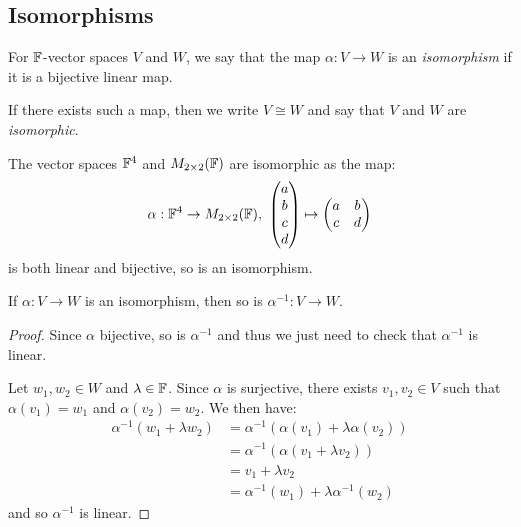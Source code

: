 \documentclass[../main.tex]{subfiles}
\begin{document}
\subsection{Isomorphisms}
\begin{definition}
  For $\mathbb{F}$-vector spaces $V$ and $W$, we say that the map $\alpha: V \to W$ is an \textit{isomorphism} if it is a bijective linear map. \label{isoDef}

  If there exists such a map, then we write $V \cong W$ and say that $V$ and $W$ are \textit{isomorphic}.
\end{definition}
\begin{example}
  The vector spaces $\mathbb{F}^{4}$ and $M_{2 \times  2}(\mathbb{F})$ are isomorphic as the map:
  \[
    \alpha: \mathbb{F}^{4} \to M_{2 \times 2}(\mathbb{F}),\ \begin{pmatrix}
    a \\
    b \\
    c \\
    d \\
    \end{pmatrix} \mapsto \begin{pmatrix}
    a & b \\
    c & d \\
    \end{pmatrix}
  \]
  is both linear and bijective, so is an isomorphism.
\end{example}
\begin{proposition}
  If $\alpha: V \to W$ is an isomorphism, then so is $\alpha^{-1}: V \to W$. \label{invIso}
\end{proposition}
\begin{proof}
  Since $\alpha$ bijective, so is $\alpha^{-1}$ and thus we just need to check that $\alpha^{-1}$ is linear.

  Let $w_1, w_2 \in W$ and $\lambda \in \mathbb{F}$.
  Since $\alpha$ is surjective, there exists $v_1, v_2 \in V$ such that $\alpha(v_1) = w_1$ and $\alpha(v_2) = w_2$.
  We then have:
  \begin{align*}
    \alpha^{-1}(w_1 + \lambda w_2) &= \alpha^{-1}(\alpha(v_1) + \lambda \alpha(v_2)) \\
                                   &= \alpha^{-1}(\alpha(v_1 + \lambda v_2)) \\
                                   &= v_1 + \lambda v_2 \\
                                   &= \alpha^{-1}(w_1) + \lambda \alpha^{-1}(w_2)
  \end{align*}
  and so $\alpha^{-1}$ is linear.
\end{proof}
\end{document}
